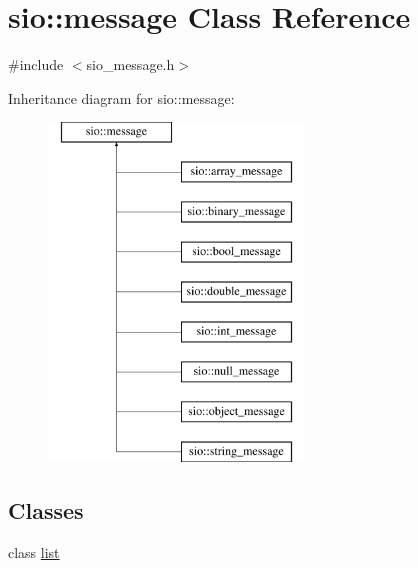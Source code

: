 \hypertarget{classsio_1_1message}{}\section{sio\+:\+:message Class Reference}
\label{classsio_1_1message}


{\ttfamily \#include $<$sio\+\_\+message.\+h$>$}

Inheritance diagram for sio\+:\+:message\+:\begin{figure}[H]
\begin{center}
\leavevmode
\includegraphics[height=9.000000cm]{classsio_1_1message}
\end{center}
\end{figure}
\subsection*{Classes}
\begin{DoxyCompactItemize}
\item 
class \hyperlink{classsio_1_1message_1_1list}{list}
\end{DoxyCompactItemize}
